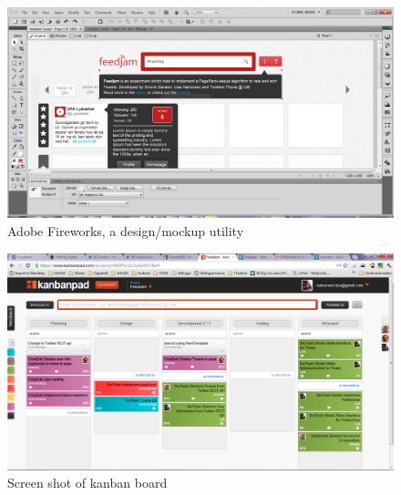 \begin{figure}[ht]
    \begin{minipage}[b]{1\linewidth}
        \centering
        \includegraphics[width=1\textwidth]{figures/fireworks}
        \caption{Adobe Fireworks, a design/mockup utility}
        \label{fig:fireworks}
    \end{minipage}
\end{figure}

\begin{figure}[ht]
    \begin{minipage}[b]{1\linewidth}
        \centering
        \includegraphics[width=1\textwidth]{figures/08052012}
        \caption{Screen shot of kanban board }
        \label{fig:kanbanScreenShot2}
    \end{minipage}
\end{figure}

